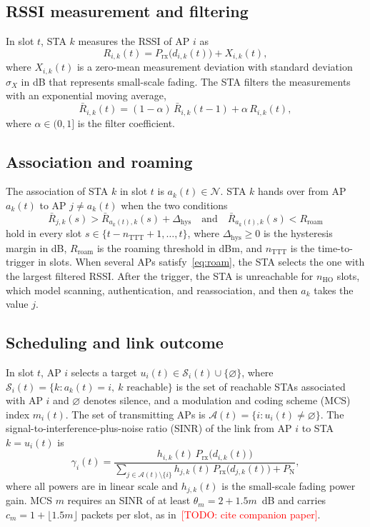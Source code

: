 \documentclass{ieeeaccess}
\newcommand{\todo}[1]{\textcolor{red}{[TODO: #1]}}
\begin{document}
\subsection{RSSI measurement and filtering}
In slot $t$, STA $k$ measures the RSSI of AP $i$ as
\begin{equation}
R_{i,k}(t) = P_{\text{rx}}\bigl(d_{i,k}(t)\bigr) + X_{i,k}(t),
\label{eq:rssi}
\end{equation}
where $X_{i,k}(t)$ is a zero-mean measurement deviation with standard deviation $\sigma_X$ in dB that represents small-scale fading. The STA filters the measurements with an exponential moving average,
\begin{equation}
\bar{R}_{i,k}(t) = (1-\alpha)\,\bar{R}_{i,k}(t-1) + \alpha\,R_{i,k}(t),
\label{eq:filter}
\end{equation}
where $\alpha \in (0, 1]$ is the filter coefficient.

\subsection{Association and roaming}
The association of STA $k$ in slot $t$ is $a_k(t) \in \mathcal{N}$. STA $k$ hands over from AP $a_k(t)$ to AP $j \ne a_k(t)$ when the two conditions
\begin{equation}
\bar{R}_{j,k}(s) > \bar{R}_{a_k(t),k}(s) + \Delta_{\text{hys}} \quad \text{and} \quad \bar{R}_{a_k(t),k}(s) < R_{\text{roam}}
\label{eq:roam}
\end{equation}
hold in every slot $s \in \{t - n_{\text{TTT}} + 1, \dots, t\}$, where $\Delta_{\text{hys}} \ge 0$ is the hysteresis margin in dB, $R_{\text{roam}}$ is the roaming threshold in dBm, and $n_{\text{TTT}}$ is the time-to-trigger in slots. When several APs satisfy~\eqref{eq:roam}, the STA selects the one with the largest filtered RSSI. After the trigger, the STA is unreachable for $n_{\text{HO}}$ slots, which model scanning, authentication, and reassociation, and then $a_k$ takes the value $j$.

\subsection{Scheduling and link outcome}
In slot $t$, AP $i$ selects a target $u_i(t) \in \mathcal{S}_i(t) \cup \{\varnothing\}$, where $\mathcal{S}_i(t) = \{k : a_k(t) = i,\ k \text{ reachable}\}$ is the set of reachable STAs associated with AP $i$ and $\varnothing$ denotes silence, and a modulation and coding scheme (MCS) index $m_i(t)$. The set of transmitting APs is $\mathcal{A}(t) = \{i : u_i(t) \ne \varnothing\}$. The signal-to-interference-plus-noise ratio (SINR) of the link from AP $i$ to STA $k = u_i(t)$ is
\begin{equation}
\gamma_{i}(t) = \frac{h_{i,k}(t)\,P_{\text{rx}}\bigl(d_{i,k}(t)\bigr)}{\sum_{j \in \mathcal{A}(t) \setminus \{i\}} h_{j,k}(t)\,P_{\text{rx}}\bigl(d_{j,k}(t)\bigr) + P_{\text{N}}},
\label{eq:sinr}
\end{equation}
where all powers are in linear scale and $h_{j,k}(t)$ is the small-scale fading power gain. MCS $m$ requires an SINR of at least $\theta_m = 2 + 1.5m$~dB and carries $c_m = 1 + \lfloor 1.5 m \rfloor$ packets per slot, as in~\todo{cite companion paper}.
\end{document}
